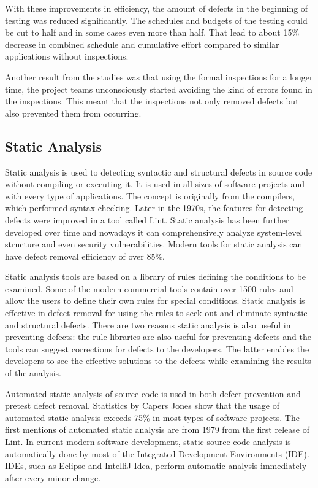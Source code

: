With these improvements in efficiency, the amount of defects in the beginning of testing was reduced significantly. The schedules and budgets of the testing could be cut to half and in some cases even more than half. That lead to about 15\% decrease in combined schedule and cumulative effort compared to similar applications without inspections.

Another result from the studies was that using the formal inspections for a longer time, the project teams unconsciously started avoiding the kind of errors found in the inspections. This meant that the inspections not only removed defects but also prevented them from occurring.




\subsection{Static Analysis} 
Static analysis is used to detecting syntactic and structural defects in source code without compiling or executing it. It is used in all sizes of software projects and with every type of applications. The concept is originally from the compilers, which performed syntax checking. Later in the 1970s, the features for detecting defects were improved in a tool called Lint. Static analysis has been further developed over time and nowadays it can comprehensively analyze system-level structure and even security vulnerabilities. Modern tools for static analysis can have defect removal efficiency of over 85\%.

Static analysis tools are based on a library of rules defining the conditions to be examined. Some of the modern commercial tools contain over 1500 rules and allow the users to define their own rules for special conditions. Static analysis is effective in defect removal for using the rules to seek out and eliminate syntactic and structural defects. There are two reasons static analysis is also useful in preventing defects: the rule libraries are also useful for preventing defects and the tools can suggest corrections for defects to the developers. The latter enables the developers to see the effective solutions to the defects while examining the results of the analysis.

Automated static analysis of source code is used in both defect prevention and pretest defect removal. Statistics by Capers Jones show that the usage of automated static analysis exceeds 75\% in most types of software projects. The first mentions of automated static analysis are from 1979 from the first release of Lint. In current modern software development, static source code analysis is automatically done by most of the Integrated Development Environments (IDE). IDEs, such as Eclipse and IntelliJ Idea, perform automatic analysis immediately after every minor change.

